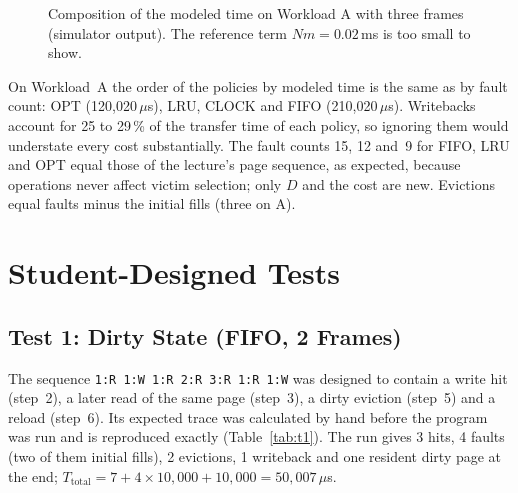 \documentclass[conference,a4paper]{IEEEtran}
\newcommand{\code}[1]{\texttt{#1}}
\begin{document}
\begin{figure}[!tb]
\centering
{}
\caption{Composition of the modeled time on Workload A with three frames (simulator output). The reference term $N m = 0.02$\,ms is too small to show.}
\label{fig:cost}
\end{figure}

On Workload~A the order of the policies by modeled time is the same as by fault count: OPT (120{,}020\,$\mu$s), LRU, CLOCK and FIFO (210{,}020\,$\mu$s). Writebacks account for 25 to 29\,\% of the transfer time of each policy, so ignoring them would understate every cost substantially. The fault counts 15, 12 and~9 for FIFO, LRU and OPT equal those of the lecture's page sequence, as expected, because operations never affect victim selection; only $D$ and the cost are new. Evictions equal faults minus the initial fills (three on A).

\section{Student-Designed Tests}\label{sec:tests}
\subsection{Test 1: Dirty State (FIFO, 2 Frames)}
The sequence \code{1:R 1:W 1:R 2:R 3:R 1:R 1:W} was designed to contain a write hit (step~2), a later read of the same page (step~3), a dirty eviction (step~5) and a reload (step~6). Its expected trace was calculated by hand before the program was run and is reproduced exactly (Table~\ref{tab:t1}). The run gives 3 hits, 4 faults (two of them initial fills), 2 evictions, 1 writeback and one resident dirty page at the end; $T_{\mathrm{total}} = 7 + 4 \times 10{,}000 + 10{,}000 = 50{,}007\,\mu$s.
\end{document}
